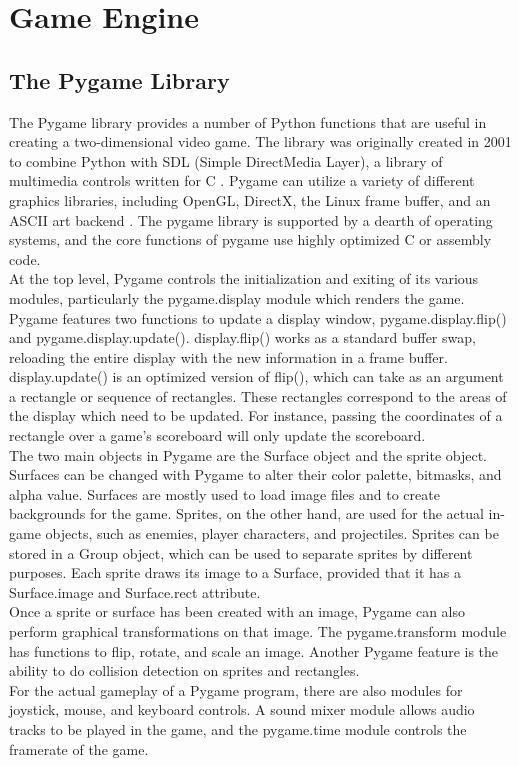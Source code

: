 \section{Game Engine}
\subsection{The Pygame Library}
The Pygame library provides a number of Python functions that are useful in creating a two-dimensional video game. The library was originally created in 2001 to combine Python with SDL (Simple DirectMedia Layer), a library of multimedia controls written for C \cite{shinners}. Pygame can utilize a variety of different graphics libraries, including OpenGL, DirectX, the Linux frame buffer, and an ASCII art backend \cite{shinners}. The pygame library is supported by a dearth of operating systems, and the core functions of pygame use highly optimized C or assembly code.\\

At the top level, Pygame controls the initialization and exiting of its various modules, particularly the pygame.display module which renders the game. Pygame features two functions to update a display window, pygame.display.flip() and pygame.display.update(). display.flip() works as a standard buffer swap, reloading the entire display with the new information in a frame buffer. display.update() is an optimized version of flip(), which can take as an argument a rectangle or sequence of rectangles. These rectangles correspond to the areas of the display which need to be updated. For instance, passing the coordinates of a rectangle over a game's scoreboard will only update the scoreboard.\\

The two main objects in Pygame are the Surface object and the sprite object. Surfaces can be changed with Pygame to alter their color palette, bitmasks, and alpha value. Surfaces are mostly used to load image files and to create backgrounds for the game. Sprites, on the other hand, are used for the actual in-game objects, such as enemies, player characters, and projectiles. Sprites can be stored in a Group object, which can be used to separate sprites by different purposes. Each sprite draws its image to a Surface, provided that it has a Surface.image and Surface.rect attribute.\\

Once a sprite or surface has been created with an image, Pygame can also perform graphical transformations on that image. The pygame.transform module has functions to flip, rotate, and scale an image. Another Pygame feature is the ability to do collision detection on sprites and rectangles.\\

For the actual gameplay of a Pygame program, there are also modules for joystick, mouse, and keyboard controls. A sound mixer module allows audio tracks to be played in the game, and the pygame.time module controls the framerate of the game.
